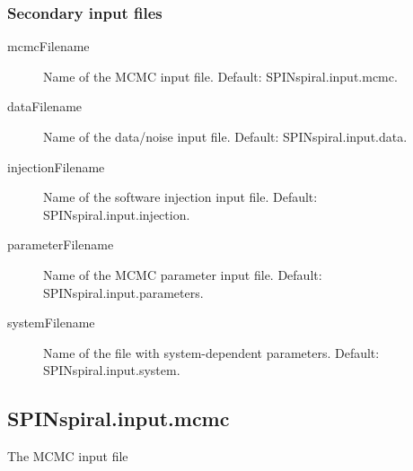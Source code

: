 \documentclass[10pt]{article}
\begin{document}
\subsubsection{Secondary input files}
\begin{description}
\item[mcmcFilename] Name of the MCMC input file.  Default: SPINspiral.input.mcmc.
\item[dataFilename] Name of the data/noise input file.  Default: SPINspiral.input.data.
\item[injectionFilename] Name of the software injection input file.  Default: SPINspiral.input.injection.
\item[parameterFilename] Name of the MCMC parameter input file.  Default: SPINspiral.input.parameters.
\item[systemFilename] Name of the file with system-dependent parameters.  Default: SPINspiral.input.system.
\end{description}










\pagebreak
\subsection{SPINspiral.input.mcmc}                                                                                                                                               
The MCMC input file                                                                                                                                                 
                                                                                                                                                                    
\end{document}
